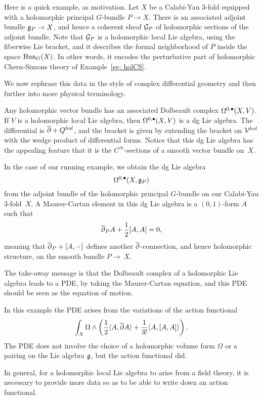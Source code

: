 \documentclass[11pt]{amsart}
\begin{document}
Here is a quick example, as motivation.
Let $X$ be a Calabi-Yau 3-fold equipped with a holomorphic principal $G$-bundle $P \to X$.
There is an associated adjoint bundle $\mathfrak g_P \to X$, and hence a coherent sheaf $\mathcal G_P$ of holomorphic sections of the adjoint bundle.
Note that $\mathcal G_P$ is a holomorphic local Lie algebra, using the fiberwise Lie bracket,
and it describes the formal neighborhood of $P$ inside the space ${\rm Bun}_G(X)$.
In other words, it encodes the perturbative part of holomorphic Chern-Simons theory of Example~\ref{eg: holCS}.

We now rephrase this data in the style of complex differential geometry and then further into more physical terminology.

Any holomorphic vector bundle has an associated Dolbeault complex $\Omega^{0,\bullet}(X,V)$. 
If $V$ is a holomorphic local Lie algebra, 
then $\Omega^{0,\bullet}(X, V)$ is a dg Lie algebra. 
The differential is ${\overline{\partial}} + Q^{hol}$, 
and the bracket is given by extending the bracket on $\mathcal V^{hol}$ with the wedge product of differential forms. 
Notice that this dg Lie algebra has the appealing feature that it is the $C^\infty$-sections of a smooth vector bundle on~$X$.

In the case of our running example, we obtain the dg Lie algebra
\[
\Omega^{0,\bullet}(X,\mathfrak g_P)
\]
from the adjoint bundle of the holomorphic principal $G$-bundle on our Calabi-Yau 3-fold~$X$.
A Maurer-Cartan element in this dg Lie algebra is a $(0,1)$-form $A$ such that
\[
{\overline{\partial}}_P A + \frac{1}{2}[A,A] = 0,
\]
meaning that ${\overline{\partial}}_P + [A,-]$ defines another ${\overline{\partial}}$-connection, and hence holomorphic structure, on the smooth bundle $P \to~X$.

The take-away message is that the Dolbeault complex of a holomorphic Lie algebra leads to a PDE, by taking the Maurer-Cartan equation,
and this PDE should be seen as the equation of motion.

In this example the PDE arises from the variations of the action functional
\[
\int_X \Omega \wedge \left( \frac{1}{2}\langle A, {\overline{\partial}} A\rangle + \frac{1}{3!}\langle A, [A,A]\rangle \right).
\]
The PDE does not involve the choice of a holomorphic volume form $\Omega$ or a pairing on the Lie algebra $\mathfrak g$, 
but the action functional did.

In general, for a holomorphic local Lie algebra to arise from a field theory,
it is necessary to provide more data so as to be able to write down an action functional.
\end{document}
